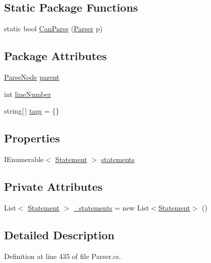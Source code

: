 \subsection*{Static Package Functions}
\begin{DoxyCompactItemize}
\item 
static bool \hyperlink{a00037_a7fa97243e2a807c2255988547d31cac7}{Can\-Parse} (\hyperlink{a00143}{Parser} p)
\end{DoxyCompactItemize}
\subsection*{Package Attributes}
\begin{DoxyCompactItemize}
\item 
\hyperlink{a00142}{Parse\-Node} \hyperlink{a00142_af313a82103fcc2ff5a177dbb06b92f7b}{parent}
\item 
int \hyperlink{a00142_a18b493382de0fde5b4299c1bd2250075}{line\-Number}
\item 
string\mbox{[}$\,$\mbox{]} \hyperlink{a00142_a58b3a15788fd2d4127d73619dc6d04ae}{tags} = \{\}
\end{DoxyCompactItemize}
\subsection*{Properties}
\begin{DoxyCompactItemize}
\item 
I\-Enumerable$<$ \hyperlink{a00160}{Statement} $>$ \hyperlink{a00037_a42e3d555bbd5ecbdf61c45ad715be7e1}{statements}
\end{DoxyCompactItemize}
\subsection*{Private Attributes}
\begin{DoxyCompactItemize}
\item 
List$<$ \hyperlink{a00160}{Statement} $>$ \hyperlink{a00037_ad79f9582e55ec75b68fd72ffcae0f41b}{\-\_\-statements} = new List$<$\hyperlink{a00160}{Statement}$>$ ()
\end{DoxyCompactItemize}


\subsection{Detailed Description}


Definition at line 435 of file Parser.\-cs.



